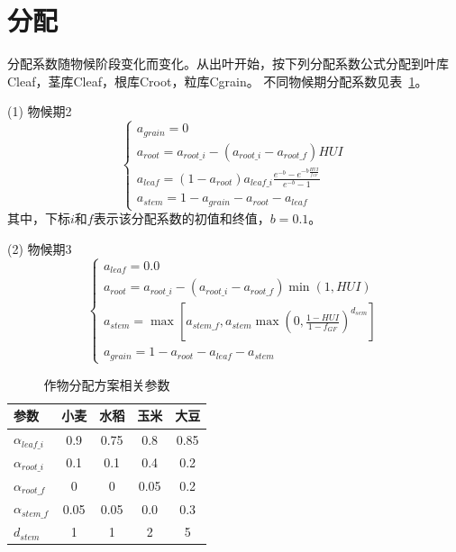 \section{分配}
分配系数随物候阶段变化而变化。从出叶开始，按下列分配系数公式分配到叶库Cleaf，茎库Cleaf，根库Croot，粒库Cgrain。
不同物候期分配系数见表~\ref{tab:作物分配方案相关参数}。

(1)	物候期2 \\
\begin{equation}
\left\{\begin{array}{c}
  a_{grain}=0 \\ 
  a_{root}=a_{root\_i}-\left(a_{root\_i}-a_{root\_f}\right) HUI \\
  a_{leaf}=\left(1-a_{root}\right) a_{leaf\_i} \frac{{e}^{-{b}}-{e}^{-b \frac{HUI}{f_{GF}}}}{{e}^{-{b}}-1}   \\
  a_{stem}=1-a_{grain}-a_{root}-a_{leaf}
  \end{array}\right.
\end{equation}
其中，下标$i$和$f$表示该分配系数的初值和终值，$b=0.1$。

(2)	物候期3 \\
\begin{equation}
  \left\{\begin{array}{c}
    a_{leaf}=0.0 \\ 
    a_{root}=a_{root\_i}-\left(a_{root\_i}-a_{root\_f}\right) \min(1, HUI) \\
    a_{stem}=\max \left[a_{stem\_f}, a_{stem} \max \left(0, \frac{1-HUI}{1-f_{GF}}\right)^{d_{sem}}\right] \\
    a_{grain}=1-a_{root}-a_{leaf}-a_{stem}
  \end{array}\right.
\end{equation}
\begin{table}[htbp]
  \centering
  \caption{作物分配方案相关参数}
  \label{tab:作物分配方案相关参数}
\begin{tabular}{@{}lcccc@{}}
  \toprule
参数       & 小麦   & 水稻   & 玉米   & 大豆   \\ \midrule
$\alpha_{leaf\_i}$ & 0.9  & 0.75 & 0.8  & 0.85 \\
$\alpha_{root\_i}$ & 0.1  & 0.1  & 0.4  & 0.2  \\
$\alpha_{root\_f}$ & 0    & 0    & 0.05 & 0.2  \\
$\alpha_{stem\_f}$ & 0.05 & 0.05 & 0.0  & 0.3  \\
$d_{stem}$    & 1    & 1    & 2    & 5   \\\bottomrule
\end{tabular}
\end{table}
